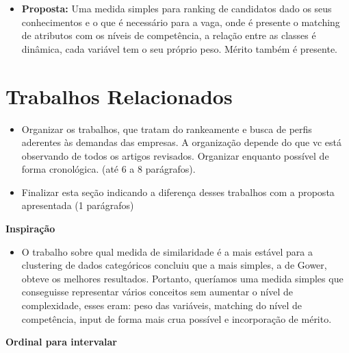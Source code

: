 \documentclass[preprint,12pt]{elsarticle}
\begin{document}
\begin{itemize}
\begin{itemize}
  \end{itemize}
  
\item \textbf{Proposta:} Uma medida simples para ranking de candidatos dado os seus conhecimentos e o que é necessário para a vaga, onde é presente o matching de atributos com os níveis de competência, a relação entre as classes é dinâmica, cada variável tem o seu próprio peso. Mérito também é presente.
\end{itemize}

\section{Trabalhos Relacionados}
\label{sec:sample2}

\begin{itemize}
\color{blue}
\item Organizar os trabalhos, que tratam do rankeamente e busca de perfis aderentes às demandas das empresas. A organização depende do que vc está observando de todos os artigos revisados. Organizar enquanto possível de forma cronológica. (até 6 a 8 parágrafos).  
\item Finalizar esta seção indicando a diferença desses trabalhos com a proposta apresentada (1 parágrafos)
\end{itemize}

\textbf{Inspiração}
\begin{itemize}
\item O trabalho \cite{DOSSANTOS20151247} sobre qual medida de similaridade é a mais estável para a clustering de dados categóricos concluiu que a mais simples, a de Gower, obteve os melhores resultados. Portanto, queríamos uma medida simples que conseguisse representar vários conceitos sem aumentar o nível de complexidade, esses eram: peso das variáveis, matching do nível de competência, input de forma mais crua possível e incorporação de mérito.
\end{itemize}

\textbf{Ordinal para intervalar}
\end{document}
